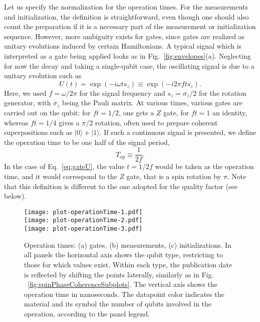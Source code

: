 \documentclass[aps, prx, showpacs, twocolumn, superscriptaddress, notitlepage, longbibliography, floatfix, nofootinbib]{revtex4-2}
\begin{document}
Let us specify the normalization for the operation times. For the measurements and initialization, the definition is straightforward, even though one should also count the preparation if it is a necessary part of the measurement or initialization sequence. However, more ambiguity exists for gates, since gates are realized as unitary evolutions induced by certain Hamiltonians. A typical signal which is interpreted as a gate being applied looks as in Fig.~\ref{fig:envelopes}(a). Neglecting for now the decay and taking a single-qubit case, the oscillating signal is due to a unitary evolution such as
\begin{equation}
U(t) = \exp\left( -i \omega t s_z \right) \equiv \exp \left( -i 2\pi f t s_z \right).
\label{eq:gateU}
\end{equation}
Here, we used $f = \omega / 2\pi$ for the signal frequency and $s_z = \sigma_z/2$ for the rotation generator, with $\sigma_z$ being the Pauli matrix.
At various times, various gates are carried out on the qubit: for $f t=1/2$, one gets a $Z$ gate, for $f t=1$ an identity, whereas $f t=1/4$ gives a $\pi/2$ rotation, often used to prepare coherent superpositions such as $|0\rangle +|1\rangle$. If such a continuous signal is presented, we define the operation time to be one half of the signal period,
\begin{equation}
T_\mathrm{op} \equiv \frac{1}{2f}.
\label{eq:gateTime}
\end{equation}
In the case of Eq.~\eqref{eq:gateU}, the value $t=1/2f$ would be taken as the operation time, and it would correspond to the $Z$ gate, that is a spin rotation by $\pi$. Note that this definition is different to the one adopted for the quality factor (see below).

\begin{figure}[t!]
  \texttt{[image: plot-operationTime-1.pdf]} \hfill\\
  \texttt{[image: plot-operationTime-2.pdf]} \hfill\\
  \texttt{[image: plot-operationTime-3.pdf]}\\
  \caption{
  \label{fig:operationTime}
    Operation times: (a) gates, (b) measurements, (c) initializations. In all panels the horizontal axis shows the qubit type, restricting to those for which values exist. Within each type, the publication date is reflected by shifting the points laterally, similarly as in Fig. ~\ref{fig:spinPhaseCoherenceSubplots}. The vertical axis shows the operation time in nanoseconds. The datapoint color indicates the material and its symbol the number of qubits involved in the operation, according to the panel legend. 
  }
\end{figure}
\end{document}
